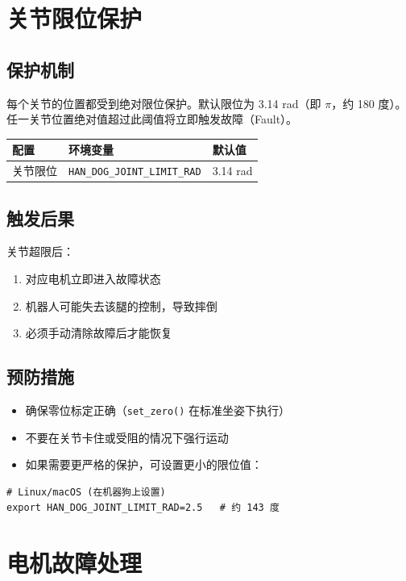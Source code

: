 \documentclass[a4paper,11pt,openany]{book}
\begin{document}
\section{关节限位保护}

\subsection{保护机制}

每个关节的位置都受到绝对限位保护。默认限位为 3.14 rad（即 $\pi$，约 180 度）。
任一关节位置绝对值超过此阈值将立即触发故障（Fault）。

\begin{longtable}{lll}
\toprule
配置 & 环境变量 & 默认值 \\
\midrule
\endhead
关节限位 & \texttt{HAN\_DOG\_JOINT\_LIMIT\_RAD} & 3.14 rad \\
\bottomrule
\end{longtable}

\subsection{触发后果}

关节超限后：

\begin{enumerate}[nosep]
  \item 对应电机立即进入故障状态
  \item 机器人可能失去该腿的控制，导致摔倒
  \item 必须手动清除故障后才能恢复
\end{enumerate}

\subsection{预防措施}

\begin{itemize}[nosep]
  \item 确保零位标定正确（\texttt{set\_zero()} 在标准坐姿下执行）
  \item 不要在关节卡住或受阻的情况下强行运动
  \item 如果需要更严格的保护，可设置更小的限位值：
\end{itemize}

\begin{lstlisting}[style=bash]
# Linux/macOS (在机器狗上设置)
export HAN_DOG_JOINT_LIMIT_RAD=2.5   # 约 143 度
\end{lstlisting}

\section{电机故障处理}
\end{document}
